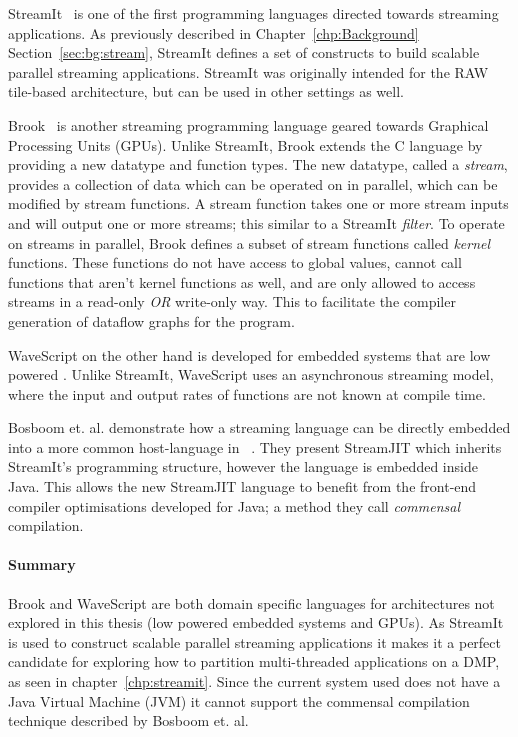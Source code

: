 StreamIt~\cite{theis2002streamit} is one of the first programming languages directed towards streaming applications.
As previously described in Chapter~\ref{chp:Background} Section~\ref{sec:bg:stream}, StreamIt defines a set of constructs to build scalable parallel streaming applications.
StreamIt was originally intended for the RAW~\cite{waingold1997raw} tile-based architecture, but can be used in other settings as well.

Brook~\cite{buck2004brook} is another streaming programming language geared towards Graphical Processing Units (GPUs).
Unlike StreamIt, Brook extends the C language by providing a new datatype and function types.
The new datatype, called a \textit{stream}, provides a collection of data which can be operated on in parallel, which can be modified by stream functions.
A stream function takes one or more stream inputs and will output one or more streams; this similar to a StreamIt \textit{filter}.
To operate on streams in parallel, Brook defines a subset of stream functions called \textit{kernel} functions.
These functions do not have access to global values, cannot call functions that aren't kernel functions as well, and are only allowed to access streams in a read-only \textit{OR} write-only way.
This to facilitate the compiler generation of dataflow graphs for the program.

WaveScript on the other hand is developed for embedded systems that are low powered \cite{newton2008wavescript}.
Unlike StreamIt, WaveScript uses an asynchronous streaming model, where the input and output rates of functions are not known at compile time.

Bosboom et. al. demonstrate how a streaming language can be directly embedded into a more common host-language in ~\cite{bosboom2014streamjit}.
They present StreamJIT which inherits StreamIt's programming structure, however the language is embedded inside Java.
This allows the new StreamJIT language to benefit from the front-end compiler optimisations developed for Java; a method they call \textit{commensal} compilation.
\vspace{-1em}
\paragraph*{Summary}
Brook and WaveScript are both domain specific languages for architectures not explored in this thesis (low powered embedded systems and GPUs).
As StreamIt is used to construct scalable parallel streaming applications it makes it a perfect candidate for exploring how to partition multi-threaded applications on a DMP, as seen in chapter~\ref{chp:streamit}.
Since the current system used does not have a Java Virtual Machine (JVM) it cannot support the commensal compilation technique described by Bosboom et. al.

